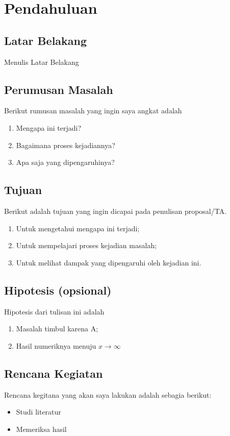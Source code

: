 \chapter{Pendahuluan}
\section{Latar Belakang}
Menulis Latar Belakang
\section{Perumusan Masalah}
Berikut rumusan masalah yang ingin saya angkat adalah
\begin{enumerate}
    \item Mengapa ini terjadi?
    \item Bagaimana proses kejadiannya?
    \item Apa saja yang dipengaruhinya?
\end{enumerate}
\section{Tujuan}
Berikut adalah tujuan yang ingin dicapai pada penulisan proposal/TA.
\begin{enumerate}
    \item Untuk mengetahui mengapa ini terjadi;
    \item Untuk mempelajari proses kejadian masalah;
    \item Untuk melihat dampak yang dipengaruhi oleh kejadian ini.
\end{enumerate}
\section{Hipotesis (opsional)}
Hipotesis dari tulisan ini adalah
\begin{enumerate}
    \item Masalah timbul karena A;
    \item Hasil numeriknya menuju $x \rightarrow \infty$
\end{enumerate}
\iflogTA
\else
\section{Rencana Kegiatan}
Rencana kegitana yang akan saya lakukan adalah sebagia berikut:
\begin{itemize}
    \item Studi literatur
    \item Memeriksa hasil
\end{itemize}
